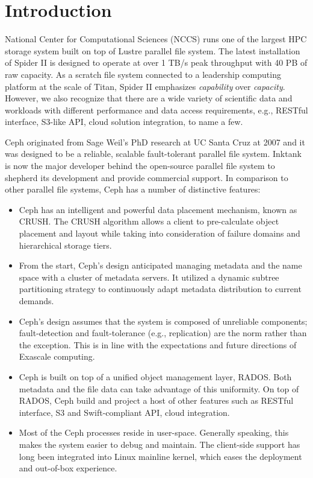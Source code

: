 \section{Introduction}

National Center for Computational Sciences (NCCS) runs one of the largest HPC
storage system built on top of Lustre parallel file system. The latest
installation of Spider II is designed to operate at over 1 TB/s peak
throughput with 40 PB of raw capacity. As a scratch file system connected to a
leadership computing platform at the scale of Titan, Spider II emphasizes
\textit{capability} over \textit{capacity}. However, we also recognize that
there are a wide variety of scientific data and workloads with different
performance and data access requirements, e.g., RESTful interface, S3-like
API, cloud solution integration, to name a few. 

Ceph\cite{Weil:2006:Ceph} originated from Sage Weil's PhD research at UC Santa
Cruz at 2007 and it was designed to be a reliable, scalable fault-tolerant
parallel file system.  Inktank is now the major developer behind the
open-source parallel file system to shepherd its development and provide
commercial support.  In comparison to other parallel file systems, Ceph has a
number of distinctive features:

\begin{itemize}
 
\item Ceph has an intelligent and powerful data placement mechanism, known as
  CRUSH. The CRUSH algorithm allows a client to pre-calculate object
  placement and layout while taking into consideration of failure domains and
  hierarchical storage tiers.
  
  \item From the start, Ceph's design anticipated managing metadata and the
  name space with a cluster of metadata servers. It utilized a dynamic subtree
  partitioning strategy to continuously adapt metadata distribution to current
  demands.

  \item Ceph's design assumes that the system is composed of unreliable
  components; fault-detection and fault-tolerance (e.g., replication) are the
  norm rather than the exception. This is in line with the expectations and
  future directions of Exascale computing.

  \item Ceph is built on top of a unified object management layer, RADOS. Both
  metadata and the file data can take advantage of this uniformity. On top of
  RADOS, Ceph build and project a host of other features such as RESTful
  interface, S3 and Swift-compliant API, cloud integration.

\item Most of the Ceph processes reside in user-space. Generally speaking, this makes the
system easier to debug and maintain. The client-side support has long been
integrated into Linux mainline kernel, which eases the deployment and out-of-box
experience.

\end{itemize}

